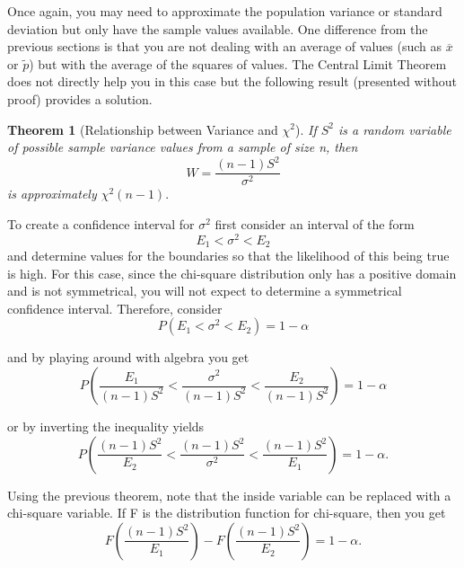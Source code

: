 \documentclass[10pt,]{book}
\theoremstyle{plain}
\newtheorem{theorem}{Theorem}[section]
\theoremstyle{definition}
\theoremstyle{definition}
\theoremstyle{definition}
\numberwithin{equation}{section}
\newcommand{\lt}{ < }
\begin{document}
Once again, you may need to approximate the population variance or standard deviation but only have the sample values available. One difference from the previous sections is that you are not dealing with an average of values (such as \(\overline{x}\) or \(\tilde{p}\)) but with the average of the squares of values. The Central Limit Theorem does not directly help you in this case but the following result (presented without proof) provides a solution.
%
\begin{theorem}[{Relationship between Variance and \(\chi ^2\)}]\label{theorem-70}
If \(S^2\) is a random variable of possible sample variance values from a sample of size n, then
\begin{equation*}W = \frac{(n-1)S^2}{\sigma^2}\end{equation*}
is approximately \(\chi ^2(n-1).\)
%
\end{theorem}
\par

To create a confidence interval for \(\sigma^2\) first consider an interval of the form
\begin{equation*}E_1 \lt \sigma^2 \lt E_2\end{equation*}
and determine values for the boundaries so that the likelihood of this being true is high. For this case, since the chi-square distribution only has a positive domain and is not symmetrical, you will not expect to determine a symmetrical confidence interval.  Therefore, consider
\begin{equation*}P (E_1 \lt \sigma^2 \lt E_2 ) = 1 - \alpha \end{equation*} 

and by playing around with algebra you get
\begin{equation*}P \left ( \frac{E_1}{(n-1)S^2} \lt \frac{\sigma^2}{(n-1)S^2} \lt \frac{E_2}{(n-1)S^2} \right ) = 1 - \alpha \end{equation*} 

or by inverting the inequality yields
\begin{equation*}P \left ( \frac{(n-1)S^2}{E_2} \lt \frac{(n-1)S^2}{\sigma^2} \lt \frac{(n-1)S^2}{E_1} \right ) = 1 - \alpha .\end{equation*} 

Using the previous theorem, note that the inside variable can be replaced with a chi-square variable. If F is the distribution function for chi-square, then you get
\begin{equation*}F \left ( \frac{(n-1)S^2}{E_1} \right ) - F \left ( \frac{(n-1)S^2}{E_2} \right ) = 1 - \alpha .\end{equation*} 
\end{document}
